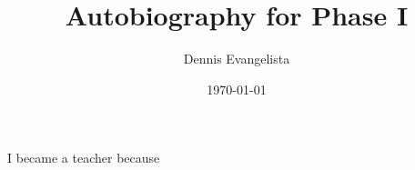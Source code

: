 \documentclass{article}
\title{Autobiography for Phase I}
\author{Dennis Evangelista}
\date{\today}
\begin{document}
\maketitle


I became a teacher because 
\end{document}
